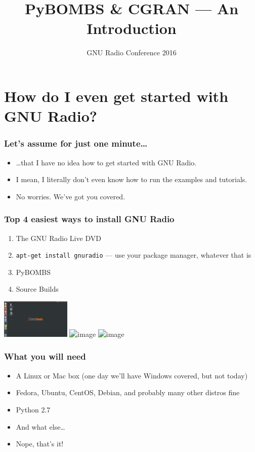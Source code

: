 \documentclass{beamer}
\title{PyBOMBS \& CGRAN --- An Introduction}
\institute{Martin Braun}
\date{GNU Radio Conference 2016}
\begin{document}
\frame{\titlepage}

\section{How do I even get started with GNU Radio?}
\begin{frame}
  \frametitle{Let's assume for just one minute\ldots}
  \begin{itemize}
    \item \ldots{}that I have no idea how to get started with GNU Radio.
    \item<2-> I mean, I literally don't even know how to run the examples and tutorials.
    \item<3-> No worries. We've got you covered.
  \end{itemize}
\end{frame}

\begin{frame}
  \frametitle{Top 4 easiest ways to install GNU Radio}
  \begin{enumerate}
    \item The GNU Radio Live DVD
    \item<2-> \texttt{apt-get install gnuradio} --- use your package manager, whatever that is
    \item<3-> PyBOMBS
    \item<4-> Source Builds
  \end{enumerate}
    \hspace{3em}
    \includegraphics[height=5em]{grlivedvd}
    \hspace{1em}
    \includegraphics<3->[height=5em]{pybombs_logo}
    \hspace{1em}
    \includegraphics<4->[height=5em]{srcbuild}
\end{frame}

\begin{frame}
  \frametitle{What you will need}
  \begin{itemize}
    \item A Linux or Mac box (one day we'll have Windows covered, but not today)
    \item Fedora, Ubuntu, CentOS, Debian, and probably many other distros fine
    \item Python 2.7
    \item<2-> And what else\ldots
    \item<3-> Nope, that's it!
  \end{itemize}
\end{frame}
\end{document}
